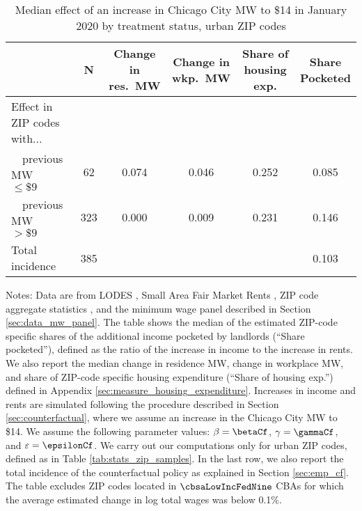 \begin{table}[hbt!]
    \centering
    \caption{Median effect of an increase in Chicago City MW to \$14 in 
    January 2020 by treatment status, urban ZIP codes}
    \label{tab:counterfactuals_chi14}

    \begin{tabular}{@{}lccccc@{}}
        \toprule
                         & N & \shortstack{Change in\\res.\ MW}
                             & \shortstack{Change in\\wkp.\ MW}
                             & \shortstack{Share of\\housing exp.}  
                             & \shortstack{Share\\Pocketed}                      \\ \midrule
        Effect in ZIP codes with...          &      &       &       &     &      \\
        $\quad$previous MW $\leq\$9\quad$    & 62 &  0.074 & 0.046  & 0.252 &  0.085   \\
        $\quad$previous MW $>\$9\quad$       & 323 &  0.000 & 0.009  & 0.231 & 0.146    \\ 
        Total incidence                      & 385 &      &      &     & 0.103    \\ \bottomrule
    \end{tabular}
    
    \begin{minipage}{.95\textwidth} \footnotesize
        \vspace{2mm}
        Notes: 
        Data are from LODES \parencite{CensusLODES}, 
        Small Area Fair Market Rents \parencite{hudSAFMR},
        ZIP code aggregate statistics \parencite{IRS}, and
        the minimum wage panel described in Section \ref{sec:data_mw_panel}.
        The table shows the median of the estimated ZIP-code specific shares of 
        the additional income pocketed by landlords (``Share pocketed''), 
        defined as the ratio of the increase in income to the increase in rents. 
        We also report the median change in residence MW, change in workplace MW,
        and share of ZIP-code specific housing expenditure 
        (``Share of housing exp.'') defined in Appendix 
        \ref{sec:measure_housing_expenditure}.
        Increases in income and rents are simulated following the procedure 
        described in Section \ref{sec:counterfactual},
        where we assume an increase in the Chicago City MW to \$14.
        We assume the following parameter values: 
        $\beta = \betaCf$, $\gamma = \gammaCf$, and $\varepsilon = \epsilonCf$.
        We carry out our computations only for urban ZIP codes, defined as 
        in Table \ref{tab:stats_zip_samples}.
        In the last row, we also report the total incidence of the counterfactual 
        policy as explained in Section \ref{sec:emp_cf}.
        The table excludes ZIP codes located in $\cbsaLowIncFedNine$ CBAs for 
        which the average estimated change in log total wages was below 0.1\%.
    \end{minipage}
\end{table}


